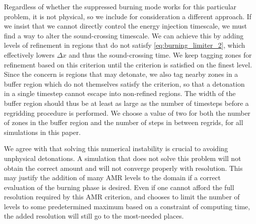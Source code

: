 \documentclass[twocolumn,numberedappendix]{../aastex6}
\begin{document}
Regardless of whether the suppressed burning mode works for this
particular problem, it is not physical, so we include for
consideration a different approach. If we insist that we
cannot directly control the energy injection timescale, we 
must find a way to alter the sound-crossing timescale. 
We can achieve this by adding levels of refinement in 
regions that do not satisfy \autoref{eq:burning_limiter_2},
which effectively lowers $\Delta x$ and thus the
sound-crossing time. We keep tagging zones for refinement
based on this criterion until the criterion is satisfied
on the finest level. Since the concern is regions that 
may detonate, we also tag nearby zones in a buffer region
which do not themselves satisfy the criterion,
so that a detonation in a single timestep cannot 
escape into non-refined regions. The width of the buffer 
region should thus be at least as large as the number of 
timesteps before a regridding procedure is performed.
We choose a value of two for both the number of zones in the 
buffer region and the number of steps in between regrids,
for all simulations in this paper.

We agree with \citet{kushnir:2013} that solving this numerical
instability is crucial to avoiding unphysical detonations.
A simulation that does not solve this problem will not obtain
the correct amount and will not converge properly with resolution.
This may justify the addition of many AMR levels to the domain
if a correct evaluation of the burning phase is desired.
Even if one cannot afford the full resolution required by this
AMR criterion, and chooses to limit the number of levels to some
predetermined maximum based on a constraint of computing time,
the added resolution will still go to the most-needed places.
\end{document}
